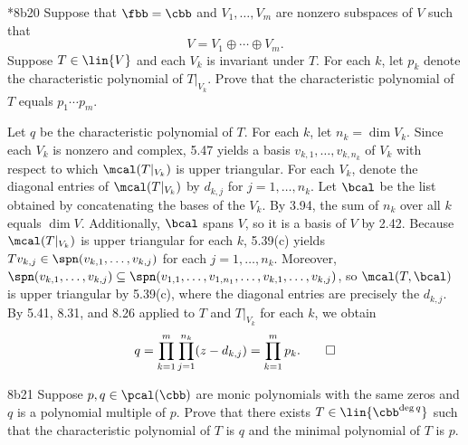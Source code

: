 \begin{exercise}*{8b20}
    Suppose that $\fbb = \cbb$ and $V_1, \ldots, V_m$ are nonzero subspaces of $V$ such that
    \[
        V = V_1 \oplus \cdots \oplus V_m.
    \]
    Suppose $T \in \lin{V}$ and each $V_k$ is invariant under $T$.
    For each $k$, let $p_k$ denote the characteristic polynomial of $T|_{V_k}$.
    Prove that the characteristic polynomial of $T$ equals $p_1 \cdots p_m$.
\end{exercise}

\begin{sol}
    Let $q$ be the characteristic polynomial of $T$.
    For each $k$, let $n_k = \dim V_k$.
    Since each $V_k$ is nonzero and complex, 5.47 yields a basis $v_{k, 1}, \ldots, v_{k, n_k}$ of $V_k$ with respect to which $\mcal(T|_{V_k})$ is upper triangular.
    For each $V_k$, denote the diagonal entries of $\mcal(T|_{V_k})$ by $d_{k, j}$ for $j = 1, \ldots, n_k$.
    Let $\bcal$ be the list obtained by concatenating the bases of the $V_k$.
    By 3.94, the sum of $n_k$ over all $k$ equals $\dim V$.
    Additionally, $\bcal$ spans $V$, so it is a basis of $V$ by 2.42.
    Because $\mcal(T|_{V_k})$ is upper triangular for each $k$, 5.39(c) yields $T v_{k, j} \in \spn(v_{k, 1}, \ldots, v_{k, j})$ for each $j = 1, \ldots, n_k$.
    Moreover, $\spn(v_{k, 1}, \ldots, v_{k, j}) \subseteq \spn(v_{1, 1}, \ldots, v_{1, n_1}, \ldots, v_{k, 1}, \ldots, v_{k, j})$, so $\mcal(T, \bcal)$ is upper triangular by 5.39(c), where the diagonal entries are precisely the $d_{k, j}$.
    By 5.41, 8.31, and 8.26 applied to $T$ and $T|_{V_k}$ for each $k$, we obtain
    \[
        q = \prod_{k=1}^m \prod_{j=1}^{n_k} (z - d_{k, j}) = \prod_{k=1}^m p_k. \qedhere
    \]
\end{sol}

\begin{exercise}{8b21}
    Suppose $p, q \in \pcal(\cbb)$ are monic polynomials with the same zeros and $q$ is a polynomial multiple of $p$.
    Prove that there exists $T \in \lin{\cbb^{\deg q}}$ such that the characteristic polynomial of $T$ is $q$ and the minimal polynomial of $T$ is $p$.

\end{exercise}

